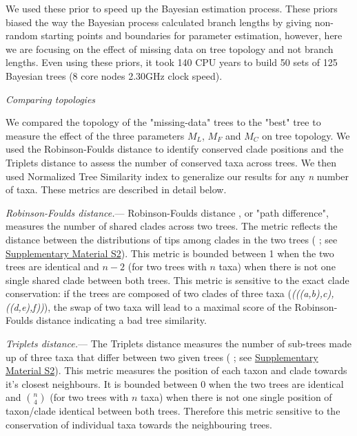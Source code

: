 \documentclass[12pt,letterpaper]{article}
\renewcommand{\subsection}[1]{%
\bigskip
\begin{center}
\begin{large}
\normalfont\itshape #1
\end{large}
\end{center}}
\renewcommand{\subsubsection}[1]{%
\vspace{2ex}
\noindent
\textit{#1.}---}
\begin{document}
We used these prior to speed up the Bayesian estimation process. These priors biased the way the Bayesian process calculated branch lengths by giving non-random starting points and boundaries for parameter estimation, however, here we are focusing on the effect of missing data on tree topology and not branch lengths. Even using these priors, it took 140 CPU years to build 50 sets of 125 Bayesian trees (8 core nodes 2.30GHz clock speed).


\subsection{Comparing topologies}
We compared the topology of the "missing-data" trees to the "best" tree to measure the effect of the three parameters $M_{L}$, $M_{F}$ and $M_{C}$ on tree topology. We used the Robinson-Foulds distance \citep{RF1981} to identify conserved clade positions and the Triplets distance \citep{dobson1975triplets} to assess the number of conserved taxa across trees. We then used Normalized Tree Similarity index \citep{Bogdanowicz2012} to generalize our results for any \textit{n} number of taxa. These metrics are described in detail below.


\subsubsection{Robinson-Foulds distance}
Robinson-Foulds distance \citep{RF1981}, or "path difference", measures the number of shared clades across two trees. The metric reflects the distance between the distributions of tips among clades in the two trees (\citealt{RF1981} ; see \hyperref[SupplementaryMaterial]{Supplementary Material S2}). This metric is bounded between 1 when the two trees are identical and $n-2$ (for two trees with $n$ taxa) when there is not one single shared clade between both trees. This metric is sensitive to the exact clade conservation: if the trees are composed of two clades of three taxa (\textit{(((a,b),c),((d,e),f))}), the swap of two taxa will lead to a maximal score of the Robinson-Foulds distance indicating a bad tree similarity.

\subsubsection{Triplets distance}
The Triplets distance \citep{dobson1975triplets} measures the number of sub-trees made up of three taxa that differ between two given trees (\citealt{critchlowthe1996} ; see \hyperref[SupplementaryMaterial]{Supplementary Material S2}). This metric measures the position of each taxon and clade towards it's closest neighbours. It is bounded between 0 when the two trees are identical and $\binom{n}{4}$ (for two trees with $n$ taxa) when there is not one single position of taxon/clade identical between both trees. Therefore this metric sensitive to the conservation of individual taxa towards the neighbouring trees.
\end{document}
